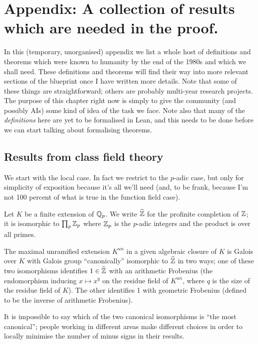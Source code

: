 \chapter{Appendix: A collection of results which are needed in the proof.}\label{ch_bestiary}

In this (temporary, unorganised) appendix we list a whole host of definitions and theorems which were known to humanity by the end of the 1980s and which we shall need. These definitions and theorems will find their way into more relevant sections of the blueprint once I have written more details. Note that some of these things are straightforward; others are probably multi-year research projects. The purpose of this chapter right now is simply to give the community (and possibly AIs) some kind of idea of the task we face. Note also that many of the \emph{definitions} here are yet to be formalised in Lean, and this needs to be done before we can start talking about formalising theorems.

\section{Results from class field theory}

We start with the local case. In fact we restrict to the $p$-adic case, but only for simplicity of exposition because it's all we'll need (and, to be frank, because I'm not 100 percent of what is true in the function field case).

Let $K$ be a finite extension of $\mathbb{Q}_p$. We write $\widehat{\mathbb{Z}}$ for the profinite completion of $\mathbb{Z}$; it is isomorphic to $\prod_p\mathbb{Z}_p$ where $\mathbb{Z}_p$ is the $p$-adic integers and the product is over all primes.

\begin{theorem}\label{maximal_unramified_extension_of_p-adic_field}\notready The maximal unramified extension $K^{un}$ in a given algebraic closure of $K$
    is Galois over $K$ with Galois group ``canonically'' isomorphic to $\widehat{\mathbb{Z}}$ in two ways; one of these two isomorphisms identifies $1\in\widehat{\mathbb{Z}}$ with an arithmetic Frobenius (the endomorphism inducing $x\mapsto x^q$ on the residue field of $K^{un}$, where $q$ is the size of the residue field of $K$). The other identifies 1 with geometric Frobenius (defined to be the inverse of arithmetic Frobenius).
\end{theorem}

It is impossible to say which of the two canonical isomorphisms is ``the most canonical''; people working in different areas make different choices in order to locally minimise the number of minus signs in their results.

